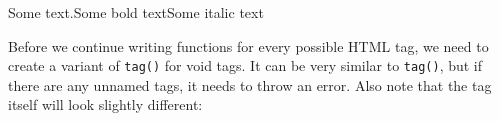 \begin{Shaded}
\begin{Highlighting}[]
\StringTok{ }\NormalTok{(}\NormalTok{)}
\StringTok{ }\NormalTok{(}\NormalTok{)}
\StringTok{ }\NormalTok{(}\NormalTok{)}
\NormalTok{(}\NormalTok{, }\NormalTok{(}\NormalTok{), }\NormalTok{(}\NormalTok{),}
   \NormalTok{)}
\end{Highlighting}
\end{Shaded}

Some text.Some bold textSome italic text

Before we continue writing functions for every possible HTML tag, we
need to create a variant of \texttt{tag()} for void tags. It can be very
similar to \texttt{tag()}, but if there are any unnamed tags, it needs
to throw an error. Also note that the tag itself will look slightly
different:

\begin{Shaded}
\begin{Highlighting}[]
\StringTok{ }
\StringTok{ }
    \NormalTok{ (}\NormalTok{(}\OperatorTok{>}\StringTok{ }\NormalTok{) \{}
      \NormalTok{(}\NormalTok{, } \NormalTok{)}
\NormalTok{    \}}
\StringTok{ }\NormalTok{(}

    \NormalTok{(}\NormalTok{(}\NormalTok{))}
\NormalTok{  \}}
\NormalTok{\}}

\StringTok{ }\NormalTok{(}\NormalTok{)}
\NormalTok{(} \NormalTok{, } \NormalTok{, } \NormalTok{)}
\end{Highlighting}
\end{Shaded}

